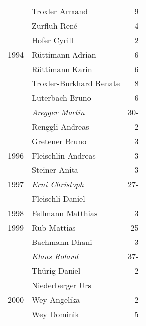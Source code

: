 {\begin{longtable}{ l l r }
                      & Troxler Armand                            & 9           \\
                      & Zurfluh René                              & 4           \\
                      & Hofer Cyrill                              & 2           \\
        1994          & Rüttimann Adrian                          & 6           \\
                      & Rüttimann Karin                           & 6           \\
                      & Troxler-Burkhard Renate                   & 8           \\
                      & Luterbach Bruno                           & 6           \\
                      & \emph{Aregger Martin}                     & 30-         \\
                      & Renggli Andreas                           & 2           \\
                      & Gretener Bruno                            & 3           \\
        1996          & Fleischlin Andreas                        & 3           \\
                      & Steiner Anita                             & 3           \\
        1997          & \emph{Erni Christoph}                     & 27-         \\
                      & Fleischli Daniel                          &             \\
        1998          & Fellmann Matthias                         & 3           \\
        1999          & Rub Mattias                               & 25          \\
                      & Bachmann Dhani                            & 3           \\
                      & \emph{Klaus Roland}                       & 37-         \\
                      & Thürig Daniel                             & 2           \\
                      & Niederberger Urs                          &             \\
        2000          & Wey Angelika                              & 2           \\
                      & Wey Dominik                               & 5           \\

\end{longtable}}
